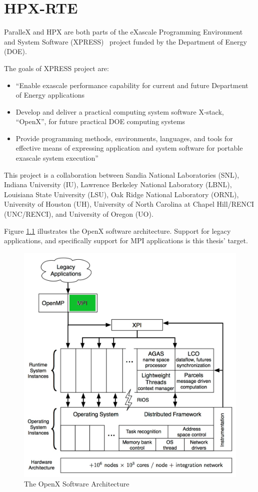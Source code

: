 \chapter{HPX-RTE}
\label{sec:HPX-RTE}
ParalleX and HPX are both parts of the eXascale Programming Environment and System Software (XPRESS)~\cite{huck2013early,brightwell2013xpress} project funded by the Department of Energy (DOE).

The goals of XPRESS project are:
\begin{itemize}
\item ``Enable exascale performance capability for current and future Department of Energy applications
\item Develop and deliver a practical computing system software X‐stack, ``OpenX'', for future practical DOE computing systems
\item Provide programming methods, environments, languages, and tools for effective means of expressing application and system software for portable exascale system execution''~\cite{xpress}
\end{itemize}

This project is a collaboration between Sandia National Laboratories (SNL), Indiana University (IU), Lawrence Berkeley National Laboratory (LBNL), Louisiana State University (LSU), Oak Ridge National Laboratory (ORNL), University of Houston (UH), University of North Carolina at Chapel Hill/RENCI (UNC/RENCI), and University of Oregon (UO).

Figure \ref{fig:openx} illustrates the OpenX software architecture. Support for legacy applications, and specifically support for MPI applications is this thesis' target.

\begin{figure}[h!]
\centering
\includegraphics[scale=0.75]{images/openx.png}
\caption[The OpenX Software Architecture]{The OpenX Software Architecture}
\label{fig:openx}
\end{figure}


